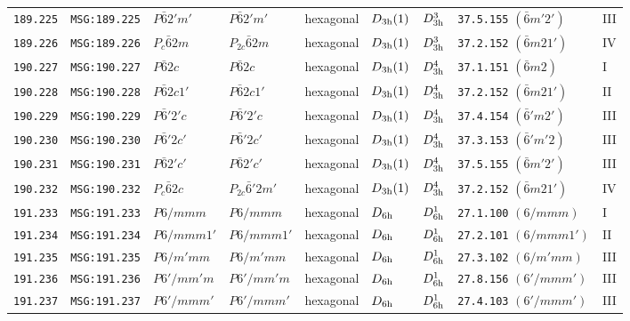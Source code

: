 \documentclass[fleqn,10pt]{jsarticle}
\begin{document}
\begin{center}
\begin{longtable}{lllllllll}
\texttt{189.225} & \texttt{MSG:189.225} & $P\bar{6}2'm'$ & $P\bar{6}2'm'$ & hexagonal & $D_{\rm 3h}(1)$ & $D_{\rm 3h}^{3}$ & \texttt{37.5.155} $(\bar{6}m'2')$ & III \\
\texttt{189.226} & \texttt{MSG:189.226} & $P_{c}\bar{6}2m$ & $P_{2c}\bar{6}2m$ & hexagonal & $D_{\rm 3h}(1)$ & $D_{\rm 3h}^{3}$ & \texttt{37.2.152} $(\bar{6}m21')$ & IV \\ \hline
\texttt{190.227} & \texttt{MSG:190.227} & $P\bar{6}2c$ & $P\bar{6}2c$ & hexagonal & $D_{\rm 3h}(1)$ & $D_{\rm 3h}^{4}$ & \texttt{37.1.151} $(\bar{6}m2)$ & I \\
\texttt{190.228} & \texttt{MSG:190.228} & $P\bar{6}2c1'$ & $P\bar{6}2c1'$ & hexagonal & $D_{\rm 3h}(1)$ & $D_{\rm 3h}^{4}$ & \texttt{37.2.152} $(\bar{6}m21')$ & II \\
\texttt{190.229} & \texttt{MSG:190.229} & $P\bar{6}'2'c$ & $P\bar{6}'2'c$ & hexagonal & $D_{\rm 3h}(1)$ & $D_{\rm 3h}^{4}$ & \texttt{37.4.154} $(\bar{6}'m2')$ & III \\
\texttt{190.230} & \texttt{MSG:190.230} & $P\bar{6}'2c'$ & $P\bar{6}'2c'$ & hexagonal & $D_{\rm 3h}(1)$ & $D_{\rm 3h}^{4}$ & \texttt{37.3.153} $(\bar{6}'m'2)$ & III \\
\texttt{190.231} & \texttt{MSG:190.231} & $P\bar{6}2'c'$ & $P\bar{6}2'c'$ & hexagonal & $D_{\rm 3h}(1)$ & $D_{\rm 3h}^{4}$ & \texttt{37.5.155} $(\bar{6}m'2')$ & III \\
\texttt{190.232} & \texttt{MSG:190.232} & $P_{c}\bar{6}2c$ & $P_{2c}\bar{6}'2m'$ & hexagonal & $D_{\rm 3h}(1)$ & $D_{\rm 3h}^{4}$ & \texttt{37.2.152} $(\bar{6}m21')$ & IV \\ \hline
\texttt{191.233} & \texttt{MSG:191.233} & $P6/mmm$ & $P6/mmm$ & hexagonal & $D_{\rm 6h}$ & $D_{\rm 6h}^{1}$ & \texttt{27.1.100} $(6/mmm)$ & I \\
\texttt{191.234} & \texttt{MSG:191.234} & $P6/mmm1'$ & $P6/mmm1'$ & hexagonal & $D_{\rm 6h}$ & $D_{\rm 6h}^{1}$ & \texttt{27.2.101} $(6/mmm1')$ & II \\
\texttt{191.235} & \texttt{MSG:191.235} & $P6/m'mm$ & $P6/m'mm$ & hexagonal & $D_{\rm 6h}$ & $D_{\rm 6h}^{1}$ & \texttt{27.3.102} $(6/m'mm)$ & III \\
\texttt{191.236} & \texttt{MSG:191.236} & $P6'/mm'm$ & $P6'/mm'm$ & hexagonal & $D_{\rm 6h}$ & $D_{\rm 6h}^{1}$ & \texttt{27.8.156} $(6'/mmm')$ & III \\
\texttt{191.237} & \texttt{MSG:191.237} & $P6'/mmm'$ & $P6'/mmm'$ & hexagonal & $D_{\rm 6h}$ & $D_{\rm 6h}^{1}$ & \texttt{27.4.103} $(6'/mmm')$ & III \\

\end{longtable}
\end{center}
\end{document}
